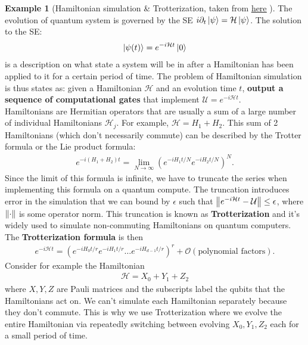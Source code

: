 \documentclass{book}
\theoremstyle{definition}
\newtheorem{exmp}{Example}[section]
\newcommand{\p}{\partial}
\newcommand{\had}{\mathcal{H}}
\newcommand{\lp}{\left(}
\newcommand{\rp}{\right)}
\newcommand{\U}{\mathcal{U}}
\begin{document}
\begin{exmp}[Hamiltonian simulation \& Trotterization, taken from \href{https://vtomole.com/blog/2019/04/07/trotter}{\underline{here}} ]
	
	The evolution of quantum system is governed by the SE $i \p_t \ket{\psi} = \had \ket{\psi}$. The solution to the SE:
	\begin{align}
	\ket{\psi(t)} = e^{-i \had t}\ket{0}
	\end{align}
	is a description on what state a system will be in after a Hamiltonian has been applied to it for a certain period of time. The problem of Hamiltonian simulation is thus states as: given a Hamiltonian $\had$ and an evolution time $t$, \textbf{output a sequence of computational gates} that implement $\U = e^{-i \had t}$.\\
	
	Hamiltonians are Hermitian operators that are usually a sum of a large number of individual Hamiltonians $\had_j$. For example, $\had = H_1 + H_2$. This sum of 2 Hamiltonians (which don't necessarily commute) can be described by the Trotter formula or the Lie product formula:
	\begin{align}
	e^{-i(H_1 + H_2)t} = \lim_{N\to \infty}\lp e^{-i H_1 t/N}e^{-iH_2 t/N} \rp^N.
	\end{align}
	Since the limit of this formula is infinite, we have to truncate the series when implementing this formula on a quantum compute. The truncation introduces error in the simulation that we can bound by $\epsilon$ such that $\norm{e^{-i \had t} - \U} \leq \epsilon$, where $\norm{\cdot}$ is some operator norm. This truncation is known as \textbf{Trotterization} and it's widely used to simulate non-commuting Hamiltonians on quantum computers. The \textbf{Trotterization formula} is then
	\begin{align}
	e^{-i \had t} = \lp e^{-iH_0 t/r}e^{-i H_1 t/r} \dots e^{-iH_{d-1}t/r}  \rp^r + \mathcal{O}(\text{polynomial factors}).
	\end{align} 
	Consider for example the Hamiltonian
	\begin{align}
	\had = X_0 + Y_1 + Z_2
	\end{align}
	where $X,Y,Z$ are Pauli matrices and the subscripts label  the qubits that the Hamiltonians act on. We can't simulate each Hamiltonian separately because they don't commute. This is why we use Trotterization where we evolve the entire Hamiltonian via repeatedly switching between evolving $X_0, Y_1, Z_2$ each for a small period of time.\\
	

\end{exmp}
\end{document}
